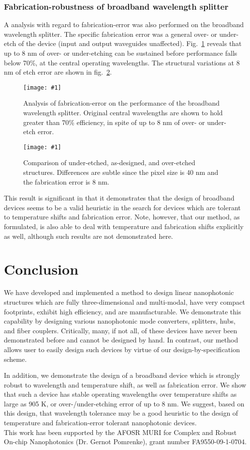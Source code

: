 \documentclass[letterpaper,10pt]{article}
\newcommand{\myfig}[2]{
    \begin{figure}[!h]
    \begin{centering}
    \texttt{[image: \#1]}
    \caption{#2}\label{#1}
    \end{centering}
    \end{figure}
}
\newcommand{\Fig}[1]{Fig.~\ref{#1}}
\newcommand{\fig}[1]{fig.~\ref{#1}}
\begin{document}
\subsubsection{Fabrication-robustness of broadband wavelength splitter}
A analysis with regard to fabrication-error
    was also performed on the broadband wavelength splitter.
The specific fabrication error was a general over- or under-etch
    of the device (input and output waveguides unaffected).
\Fig{analysis_fab_shift2} reveals that up to 8 nm of over- or under-etching
    can be sustained before performance falls below 70\%, at the central
    operating wavelengths.
The structural variations at 8 nm of etch error are shown in \fig{top_wdm_overunder}.
    
\myfig{analysis_fab_shift2}
    {Analysis of fabrication-error on the performance of the broadband 
    wavelength splitter.
    Original central wavelengths are shown to hold greater than 70\% efficiency,
    in spite of up to 8 nm of over- or under-etch error.}
\myfig{top_wdm_overunder}
    {Comparison of under-etched, as-designed, and over-etched structures.
    Differences are subtle since the pixel size is 40 nm and the
    fabrication error is 8 nm.}

This result is significant in that it demonstrates
    that the design of broadband devices
    seems to be a valid heuristic in the search for 
    devices which are tolerant to temperature shifts and fabrication error.
Note, however, that our method, as formulated, is also able to
    deal with temperature and fabrication shifts explicitly as well,
    although such results are not demonstrated here.

\section{Conclusion}
We have developed and implemented a method to design linear nanophotonic structures
    which are fully three-dimensional and multi-modal,
    have very compact footprints,
    exhibit high efficiency, and
    are manufacturable.
We demonstrate this capability by designing various nanophotonic mode converters,
    splitters, hubs, and fiber couplers.
Critically, many, if not all, of these devices have never been demonstrated before
    and cannot be designed by hand.
In contrast, our method allows user to easily design such devices
    by virtue of our design-by-specification scheme.

In addition, we demonstrate the design of a broadband device 
    which is strongly robust to wavelength and temperature shift,
    as well as fabrication error.
We show that such a device has stable operating wavelengths 
    over temperature shifts as large as 905 K,
    or over-/under-etching error of up to 8 nm.
We suggest, based on this design, that wavelength tolerance
    may be a good heuristic to the design of temperature and fabrication-error
    tolerant nanophotonic devices. \\

This work has been supported by the 
    AFOSR MURI for Complex and Robust On-chip Nanophotonics 
    (Dr. Gernot Pomrenke), grant number FA9550-09-1-0704.
\end{document}
